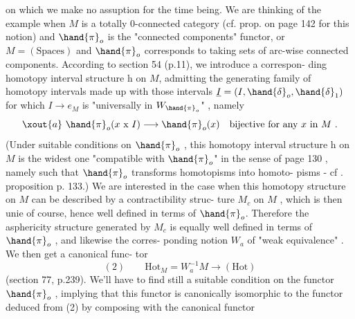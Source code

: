 on which we make no assuption for the time being. We are thinking of
the example when $M$ is a totally 0-connected category (cf. prop. on page
142 for this notion) and $\hand{\pi}_o$ is the "connected components" functor, or 
$M = (\mathrm{Spaces})$ and $\hand{\pi}_o$ corresponds to taking sets of arc-wise connected
components. According to section 54 (p.11), we introduce a correspon-%
ding homotopy interval structure h on $M$, admitting the generating family
of homotopy intervals made up with those intervals $\underline{I} = (I,\hand{\delta}_o,\hand{\delta}_1)$ 
for which $I \longrightarrow e_M$ is "universally in $W_{\hand{\pi}_o}$" , namely
\[ \xout{a}\ \hand{\pi}_o(x \text{ x } I) \longrightarrow \hand{\pi}_o(x) \quad \text{bijective for any } x \text{ in } M \ . \]
(Under suitable conditions on $\hand{\pi}_o$ , this  homotopy interval
structure h on $M$ is the widest one "compatible with $\hand{\pi}_o$" in the sense
of page 130 , namely such that $\hand{\pi}_o$ transforms homotopisms into homoto-%
pisms - cf . proposition p. 133.) We are interested in the case when
this homotopy structure on $M$ can be described by a contractibility struc-%
ture $M_c$ on $M$ , which is then unie of course, hence well defined in
terms of $\hand{\pi}_o$. Therefore the asphericity structure  generated
by $M_c$ is equally well defined in terms of $\hand{\pi}_o$ , and likewise the corres-%
ponding notion $W_a$ of "weak equivalence" . We then get a canonical func-%
tor
\[ (2) \qquad \mathrm{Hot}_M = W_a^{-1}M \longrightarrow (\mathrm{Hot}) \]
(section 77, p.239). We'll have to find still a suitable  condition on
the functor $\hand{\pi}_o$ , implying that this functor is canonically isomorphic
to the functor deduced from (2) by composing with the canonical functor

